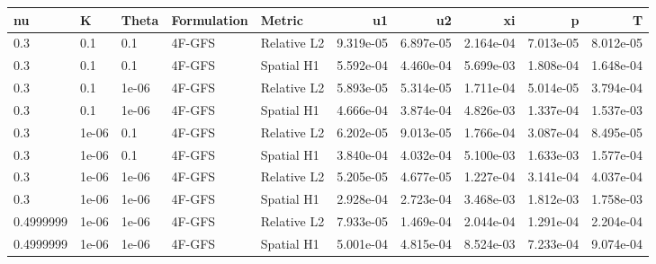 \begin{tabular}{lllllrrrrr}
\hline
nu & K & Theta & Formulation & Metric & u1 & u2 & xi & p & T \\
\hline
0.3 & 0.1 & 0.1 & 4F-GFS & Relative L2 & 9.319e-05 & 6.897e-05 & 2.164e-04 & 7.013e-05 & 8.012e-05 \\
0.3 & 0.1 & 0.1 & 4F-GFS & Spatial H1 & 5.592e-04 & 4.460e-04 & 5.699e-03 & 1.808e-04 & 1.648e-04 \\
0.3 & 0.1 & 1e-06 & 4F-GFS & Relative L2 & 5.893e-05 & 5.314e-05 & 1.711e-04 & 5.014e-05 & 3.794e-04 \\
0.3 & 0.1 & 1e-06 & 4F-GFS & Spatial H1 & 4.666e-04 & 3.874e-04 & 4.826e-03 & 1.337e-04 & 1.537e-03 \\
0.3 & 1e-06 & 0.1 & 4F-GFS & Relative L2 & 6.202e-05 & 9.013e-05 & 1.766e-04 & 3.087e-04 & 8.495e-05 \\
0.3 & 1e-06 & 0.1 & 4F-GFS & Spatial H1 & 3.840e-04 & 4.032e-04 & 5.100e-03 & 1.633e-03 & 1.577e-04 \\
0.3 & 1e-06 & 1e-06 & 4F-GFS & Relative L2 & 5.205e-05 & 4.677e-05 & 1.227e-04 & 3.141e-04 & 4.037e-04 \\
0.3 & 1e-06 & 1e-06 & 4F-GFS & Spatial H1 & 2.928e-04 & 2.723e-04 & 3.468e-03 & 1.812e-03 & 1.758e-03 \\
0.4999999 & 1e-06 & 1e-06 & 4F-GFS & Relative L2 & 7.933e-05 & 1.469e-04 & 2.044e-04 & 1.291e-04 & 2.204e-04 \\
0.4999999 & 1e-06 & 1e-06 & 4F-GFS & Spatial H1 & 5.001e-04 & 4.815e-04 & 8.524e-03 & 7.233e-04 & 9.074e-04 \\
\hline
\end{tabular}
